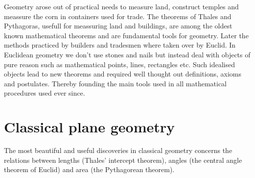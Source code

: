 


Geometry arose out of practical needs to measure land, construct temples and meassure the corn in containers used for trade. The theorems of Thales and Pythagoras, usefull for meassuring land and buildings, are among the oldest known mathematical theorems and are fundamental tools for geometry. Later the methods practiced by builders and tradesmen where taken over by Euclid. In Euclidean geometry we don't use stones and nails but instead deal with objects of pure reason such as mathematical points, lines, rectangles etc. Such idealised objects lead to new theorems and required well thought out definitions, axioms and postulates. Thereby founding the main tools used in all mathematical procedures used ever since.

\section{Classical plane geometry}
The most beautiful and useful discoveries in classical geometry concerns the relations between lengths (Thales’ intercept theorem), angles (the central angle theorem of Euclid) and area (the Pythagorean theorem).

